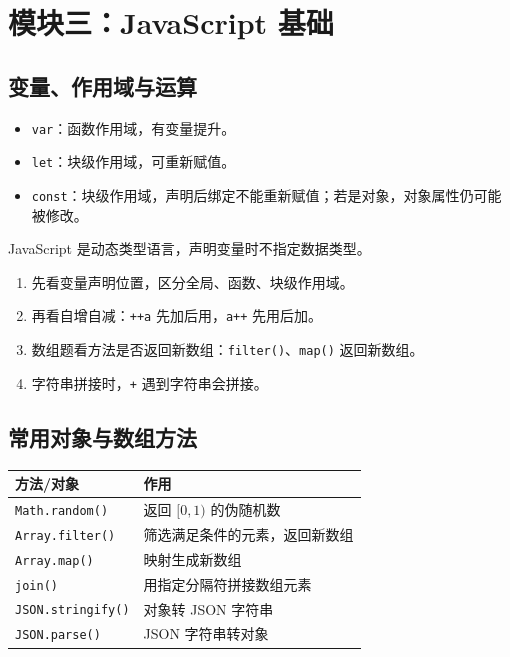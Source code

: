 \documentclass[UTF8,zihao=-4]{ctexart}
\begin{document}
\section{模块三：JavaScript 基础}

\subsection{变量、作用域与运算}
\begin{keybox}[变量声明]
\begin{itemize}
  \item \texttt{var}：函数作用域，有变量提升。
  \item \texttt{let}：块级作用域，可重新赋值。
  \item \texttt{const}：块级作用域，声明后绑定不能重新赋值；若是对象，对象属性仍可能被修改。
\end{itemize}
JavaScript 是动态类型语言，声明变量时不指定数据类型。
\end{keybox}

\begin{methodbox}[输出结果题模板]
\begin{enumerate}
  \item 先看变量声明位置，区分全局、函数、块级作用域。
  \item 再看自增自减：\texttt{++a} 先加后用，\texttt{a++} 先用后加。
  \item 数组题看方法是否返回新数组：\texttt{filter()}、\texttt{map()} 返回新数组。
  \item 字符串拼接时，\texttt{+} 遇到字符串会拼接。
\end{enumerate}
\end{methodbox}

\subsection{常用对象与数组方法}
\begin{longtable}{p{}p{}}
\toprule
\textbf{方法/对象} & \textbf{作用} \\
\midrule
\texttt{Math.random()} & 返回 $[0,1)$ 的伪随机数 \\
\texttt{Array.filter()} & 筛选满足条件的元素，返回新数组 \\
\texttt{Array.map()} & 映射生成新数组 \\
\texttt{join()} & 用指定分隔符拼接数组元素 \\
\texttt{JSON.stringify()} & 对象转 JSON 字符串 \\
\texttt{JSON.parse()} & JSON 字符串转对象 \\
\bottomrule
\end{longtable}
\end{document}
